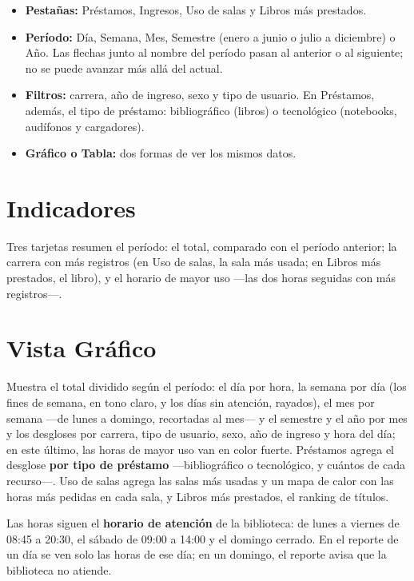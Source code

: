 \documentclass[11pt,a4paper]{report}
\begin{document}
\begin{itemize}
  \item \textbf{Pestañas:} Préstamos, Ingresos, Uso de salas y Libros más
  prestados.
  \item \textbf{Período:} Día, Semana, Mes, Semestre (enero a junio o julio
  a diciembre) o Año. Las flechas junto al nombre del período pasan al
  anterior o al siguiente; no se puede avanzar más allá del actual.
  \item \textbf{Filtros:} carrera, año de ingreso, sexo y tipo de usuario.
  En Préstamos, además, el tipo de préstamo: bibliográfico (libros) o
  tecnológico (notebooks, audífonos y cargadores).
  \item \textbf{Gráfico o Tabla:} dos formas de ver los mismos datos.
\end{itemize}

\section{Indicadores}

Tres tarjetas resumen el período: el total, comparado con el período
anterior; la carrera con más registros (en Uso de salas, la sala más
usada; en Libros más prestados, el libro), y el horario de mayor uso ---las
dos horas seguidas con más registros---.

\section{Vista Gráfico}

Muestra el total dividido según el período: el día por hora, la semana por
día (los fines de semana, en tono claro, y los días sin atención,
rayados), el mes por semana ---de lunes a domingo, recortadas al mes--- y
el semestre y el año por mes y los
desgloses por carrera, tipo de usuario, sexo, año de ingreso y hora del
día; en este último, las horas de mayor uso van en color fuerte.
Préstamos agrega el desglose \textbf{por tipo de préstamo} ---bibliográfico
o tecnológico, y cuántos de cada recurso---. Uso de
salas agrega las salas más usadas y un mapa de calor con las horas más
pedidas en cada sala, y Libros más prestados, el ranking de títulos.

Las horas siguen el \textbf{horario de atención} de la biblioteca: de
lunes a viernes de 08:45 a 20:30, el sábado de 09:00 a 14:00 y el domingo
cerrado. En el reporte de un día se ven solo las horas de ese día; en un
domingo, el reporte avisa que la biblioteca no atiende.
\end{document}
